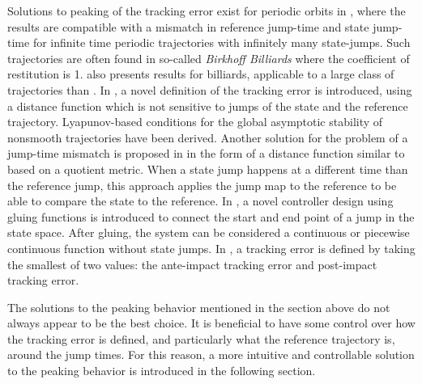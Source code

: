 \documentclass[../DC2017114Bouma.tex]{subfiles}
\begin{document}
Solutions to peaking of the tracking error exist for periodic orbits in \cite{Menini2001,Galeani2008}, where the results are compatible with a mismatch in reference jump-time and state jump-time for infinite time periodic trajectories with infinitely many state-jumps. Such trajectories are often found in so-called \textit{Birkhoff Billiards} where the coefficient of restitution is 1. \cite{Forni2013} also presents results for billiards, applicable to a large class of trajectories than \cite{Menini2001,Galeani2008}. In \cite{Biemond2013,Biemond2016}, a novel definition of the tracking error is introduced, using a distance function which is not sensitive to jumps of the state and the reference trajectory. Lyapunov-based conditions for the global asymptotic stability of nonsmooth trajectories have been derived. Another solution for the problem of a jump-time mismatch is proposed in \cite{Baumann2018} in the form of a distance function similar to \cite{Biemond2013,Biemond2016} based on a quotient metric. When a state jump happens at a different time than the reference jump, this approach applies the jump map to the reference to be able to compare the state to the reference. In \cite{Kim2016}, a novel controller design using gluing functions is introduced to connect the start and end point of a jump in the state space. After gluing, the system can be considered a continuous or piecewise continuous function without state jumps. In \cite{Yang2017}, a tracking error is defined by taking the smallest of two values: the ante-impact tracking error and post-impact tracking error.

The solutions to the peaking behavior mentioned in the section above do not always appear to be the best choice. It is beneficial to have some control over how the tracking error is defined, and particularly what the reference trajectory is, around the jump times. For this reason, a more intuitive and controllable solution to the peaking behavior is introduced in the following section.
\end{document}
